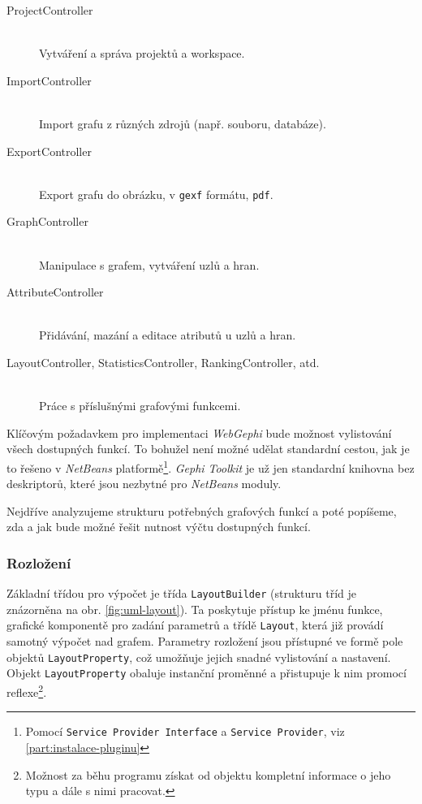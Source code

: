 \documentclass[thesis=M,czech]{FITthesis}[2014/05/6]
\begin{document}
\begin{description}
  \item[ProjectController] \hfill \\
  Vytváření a správa projektů a workspace.
  \item[ImportController] \hfill \\
  Import grafu z různých zdrojů (např. souboru, databáze).
  \item[ExportController] \hfill \\
  Export grafu do obrázku, v \texttt{gexf} formátu, \texttt{pdf}.
  \item[GraphController] \hfill \\
  Manipulace s grafem, vytváření uzlů a hran.
 \item[AttributeController] \hfill \\
  Přidávání, mazání a editace atributů u uzlů a hran.
  \item[LayoutController, StatisticsController, RankingController, atd.] \hfill \\
  Práce s příslušnými grafovými funkcemi.
\end{description}

Klíčovým požadavkem pro implementaci \textit{WebGephi} bude možnost vylistování všech dostupných funkcí.
To bohužel není možné udělat standardní cestou, jak je to řešeno v \textit{NetBeans} platformě\footnote{Pomocí \texttt{Service Provider Interface} a \texttt{Service Provider}, viz \ref{part:instalace-pluginu}}. 
\textit{Gephi Toolkit} je už jen standardní knihovna bez deskriptorů, které jsou nezbytné pro \textit{NetBeans} moduly.

Nejdříve analyzujeme strukturu potřebných grafových funkcí a poté popíšeme, zda a jak bude možné řešit nutnost výčtu dostupných funkcí.

\subsubsection{Rozložení}
Základní třídou pro výpočet  je třída \texttt{LayoutBuilder} (strukturu tříd je znázorněna na obr. \ref{fig:uml-layout}). Ta poskytuje přístup ke jménu funkce, grafické komponentě pro zadání parametrů a
třídě \texttt{Layout}, která již provádí samotný výpočet nad grafem. Parametry rozložení jsou přístupné ve formě pole objektů \texttt{LayoutProperty},
což umožňuje jejich snadné vylistování a nastavení. Objekt \texttt{LayoutProperty} obaluje instanční proměnné a přistupuje k nim promocí reflexe\footnote{Možnost 
za běhu programu získat od objektu kompletní informace o jeho typu a dále s nimi pracovat.}.
\end{document}
